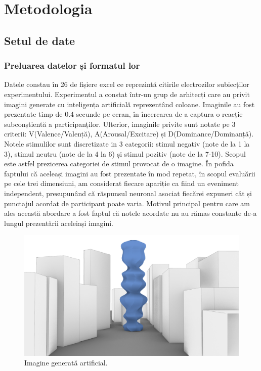 \def\totalEpoci{5598}
\def\totalEpociTestare{0}
\def\totalEpociValentaPozitiva{1014}
\def\totalEpociValentaNegativa{942}
\def\totalEpociValentaNeutra{3642}
\def\crestereAcurateteAutoReject{10}
\def\nrParticipantiAntrenare{21}
\def\nrParticipantiValidare{2}
\def\nrParticipantiTestare{3}

\chapter{Metodologia}

\section{Setul de date}
\subsection{Preluarea datelor și formatul lor}
Datele constau în 26 de fișiere excel ce reprezintă citirile electrozilor subiecților experimentului.
Experimentul a constat într-un grup de arhitecți care au privit imagini generate cu inteligența artificială reprezentând coloane. Imaginile au fost prezentate timp de 0.4 secunde pe ecran, în încercarea de a captura o reacție subconștientă a participanților.
Ulterior, imaginile  privite sunt notate pe 3 criterii: V(Valence/Valență), A(Arousal/Excitare) și D(Dominance/Dominanță). 
Notele stimulilor sunt discretizate in 3 categorii: stimul negativ (note de la 1 la 3), stimul neutru (note de la 4 la 6) și stimul pozitiv (note de la 7-10). 
Scopul este astfel prezicerea categoriei de stimul provocat de o imagine. În pofida faptului că aceleași imagini au fost prezentate în mod repetat, în scopul evaluării pe cele trei dimensiuni, am considerat fiecare apariție ca fiind un eveniment independent, presupunând că răspunsul neuronal asociat fiecărei expuneri cât și punctajul acordat de participant poate varia. Motivul principal pentru care am ales această abordare a fost faptul că notele acordate nu au rămas constante de-a lungul prezentării aceleiași imagini.

\begin{figure}[H]
    \centering
		\vspace{-1em}
    \includegraphics[width=0.5\linewidth]{stimul_image.png}
    \caption{Imagine generată artificial.}
		\vspace{-1em}
    \label{fig:enter-label}
\end{figure}

